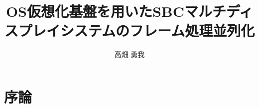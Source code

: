 \documentclass[12pt,a4paper]{jbook}
\title{OS仮想化基盤を用いたSBCマルチディスプレイシステムのフレーム処理並列化}
\author{高畑 勇我}
\begin{document}
\coverpage

\tableofcontents

\body

\chapter{序論}













\end{document}
